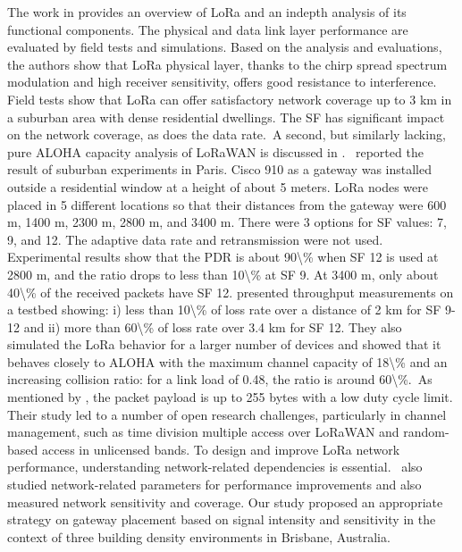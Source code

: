  \cite{augustin_study_2016}   The work in \cite{augustin_study_2016} provides an overview of LoRa and an indepth analysis of its functional components. The physical and data link layer performance are evaluated by field tests and simulations. Based on the analysis and evaluations, the authors show that LoRa physical layer, thanks to the chirp spread spectrum modulation and high receiver sensitivity, offers good resistance to interference. Field tests show that LoRa can offer satisfactory network coverage up to 3 km in a suburban area with dense residential dwellings. The SF has significant impact on the network coverage, as does the data rate.~A second, but similarly lacking, pure ALOHA capacity analysis of LoRaWAN is discussed in \cite{augustin_study_2016}.~\citet{augustin_study_2016} reported the result of suburban experiments in Paris. Cisco 910 as a gateway was installed outside a residential window at a height of about 5 meters. LoRa nodes were placed in 5 different locations so that their distances from the gateway were 600 m, 1400 m, 2300 m, 2800 m, and 3400 m. There were 3 options for SF values: 7, 9, and 12. The adaptive data rate and retransmission were not used. Experimental results show that the PDR is about 90\textbackslash\% when SF 12 is used at 2800 m, and the ratio drops to less than 10\textbackslash\% at SF 9. At 3400 m, only about 40\textbackslash\% of the received packets have SF 12.\citet{augustin_study_2016} presented throughput measurements on a testbed showing: i) less than 10\textbackslash\% of loss rate over a distance of 2 km for SF 9-12 and ii) more than 60\textbackslash\% of loss rate over 3.4 km for SF 12. They also simulated the LoRa behavior for a larger number of devices and showed that it behaves closely to ALOHA with the maximum channel capacity of 18\textbackslash\% and an increasing collision ratio: for a link load of 0.48, the ratio is around 60\textbackslash\%.~As mentioned by \citet{augustin_study_2016}, the packet payload is up to 255 bytes with a low duty cycle limit. Their study led to a number of open research challenges, particularly in channel management, such as time division multiple access over LoRaWAN and random-based access in unlicensed bands. To design and improve LoRa network performance, understanding network-related dependencies is essential.~\citet{augustin_study_2016} also studied network-related parameters for performance improvements and also measured network sensitivity and coverage. Our study proposed an appropriate strategy on gateway placement based on signal intensity and sensitivity in the context of three building density environments in Brisbane, Australia.~   \newline 

\restoregeometry
